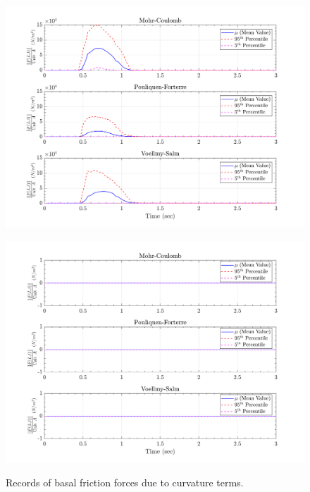 \documentclass{article}
\begin{document}
\begin{figure}[H]
	\begin{minipage}[b]{0.5\linewidth}
    	\centering
    	\includegraphics[width=1\textwidth]{InclinedPlane/LocalRecords/Records/Fbc_L15.png}
    	\label{fig:Ramp-L3-Fbc}
	\end{minipage}
	\begin{minipage}[b]{0.5\linewidth}
		\centering
		\includegraphics[width=1\textwidth]{InclinedPlane/LocalRecords/Records/Fbc_L17.png}
    	\label{fig:Ramp-L4-Fbc}
    \end{minipage}
    \caption{Records of basal friction forces due to curvature terms.}
    \label{fig:Ramp-LM-Fbc}    
\end{figure}
\end{document}
